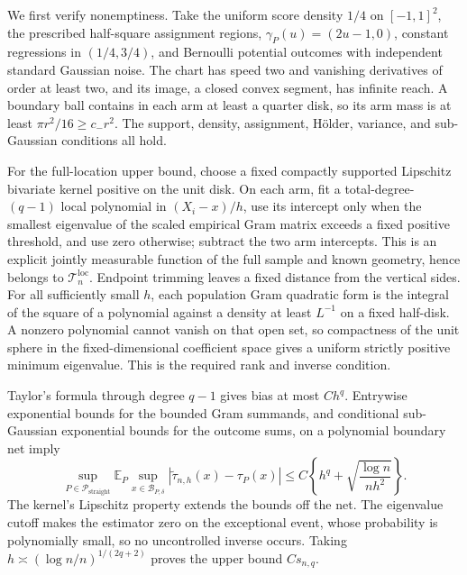 We first verify nonemptiness.  Take the uniform score density \(1/4\) on \([-1,1]^2\), the prescribed half-square assignment regions, \(\gamma_P(u)=(2u-1,0)\), constant regressions in \((1/4,3/4)\), and Bernoulli potential outcomes with independent standard Gaussian noise.  The chart has speed two and vanishing derivatives of order at least two, and its image, a closed convex segment, has infinite reach.  A boundary ball contains in each arm at least a quarter disk, so its arm mass is at least \(\pi r^2/16\geq c_-r^2\).  The support, density, assignment, H\"older, variance, and sub-Gaussian conditions all hold.

For the full-location upper bound, choose a fixed compactly supported Lipschitz bivariate kernel positive on the unit disk.  On each arm, fit a total-degree-\((q-1)\) local polynomial in \((X_i-x)/h\), use its intercept only when the smallest eigenvalue of the scaled empirical Gram matrix exceeds a fixed positive threshold, and use zero otherwise; subtract the two arm intercepts.  This is an explicit jointly measurable function of the full sample and known geometry, hence belongs to \(\mathcal T_n^{\mathrm{loc}}\).  Endpoint trimming leaves a fixed distance from the vertical sides.  For all sufficiently small \(h\), each population Gram quadratic form is the integral of the square of a polynomial against a density at least \(L^{-1}\) on a fixed half-disk.  A nonzero polynomial cannot vanish on that open set, so compactness of the unit sphere in the fixed-dimensional coefficient space gives a uniform strictly positive minimum eigenvalue.  This is the required rank and inverse condition.

Taylor's formula through degree \(q-1\) gives bias at most \(Ch^q\).  Entrywise exponential bounds for the bounded Gram summands, and conditional sub-Gaussian exponential bounds for the outcome sums, on a polynomial boundary net imply
\[
 \sup_{P\in\mathcal P_{\mathrm{straight}}}
 \mathbb E_P\sup_{x\in\mathcal B_{P,\delta}}
 |\widetilde\tau_{n,h}(x)-\tau_P(x)|
 \leq C\left\{h^q+\sqrt{\frac{\log n}{nh^2}}\right\}.
\]
The kernel's Lipschitz property extends the bounds off the net.  The eigenvalue cutoff makes the estimator zero on the exceptional event, whose probability is polynomially small, so no uncontrolled inverse occurs.  Taking \(h\asymp(\log n/n)^{1/(2q+2)}\) proves the upper bound \(Cs_{n,q}\).

